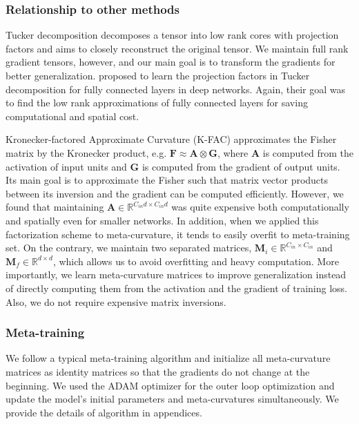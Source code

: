 \documentclass{article}
\newcommand*{\B}[1]{\mathbf{#1}}
\begin{document}
\subsubsection{Relationship to other methods}
Tucker decomposition \cite{KoBa09} decomposes a tensor into low rank cores with projection factors and aims to closely reconstruct the original tensor. We maintain full rank gradient tensors, however, and our main goal is to transform the gradients for better generalization. \cite{Kossaif-arxiv-2018} proposed to learn the projection factors in Tucker decomposition for fully connected layers in deep networks. Again, their goal was to find the low rank approximations of fully connected layers for saving computational and spatial cost.

Kronecker-factored Approximate Curvature (K-FAC) \cite{Martens-icml-2015,Grosse-icml-2016} approximates the Fisher matrix by the Kronecker product, e.g. $\B{F} \approx \B{A} \otimes \B{G}$, where $\B{A}$ is computed from the activation of input units and $\B{G}$ is computed from the gradient of output units. Its main goal is to approximate the Fisher such that matrix vector products between its inversion and the gradient can be computed efficiently. However, we found that maintaining $\B{A} \in \mathbb{R}^{C_{in}d \times C_{in}d}$ was quite expensive both computationally and spatially even for smaller networks. In addition, when we applied this factorization scheme to meta-curvature, it tends to easily overfit to meta-training set. On the contrary, we maintain two separated matrices, $\mathbf{M}_{i} \in \mathbb{R}^{C_{in} \times C_{in}}$ and $\mathbf{M}_f \in \mathbb{R}^{d \times d}$, which allows us to avoid overfitting and heavy computation. More importantly, we learn meta-curvature matrices to improve generalization instead of directly computing them from the activation and the gradient of training loss. Also, we do not require expensive matrix inversions.






\subsubsection{Meta-training}
We follow a typical meta-training algorithm and initialize all meta-curvature matrices as identity matrices so that the gradients do not change at the beginning. We used the ADAM \cite{adam} optimizer for the outer loop optimization and update the model's initial parameters and meta-curvatures simultaneously. We provide the details of algorithm in appendices.
\end{document}
